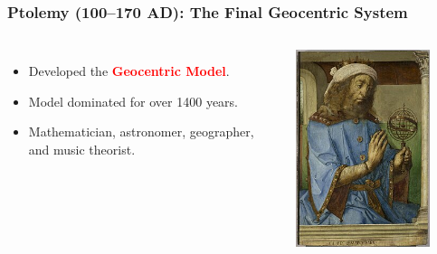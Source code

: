 \documentclass[aspectratio=1611, 9pt]{beamer}
\begin{document}
\begin{frame}
  \frametitle{Ptolemy (100–170 AD): The Final Geocentric System}
  \begin{columns}
    \begin{itemize}
      \item Developed the \textcolor{red}{\textbf{Geocentric Model}}.
      \item Model dominated for over 1400 years.
      \item Mathematician, astronomer, geographer, and music theorist.
    \end{itemize}

    \begin{center}
      \includegraphics[width=0.8\textwidth]{pictures/Ptolemy.jpg}
    \end{center}
  \end{columns}
\end{frame}
\end{document}
